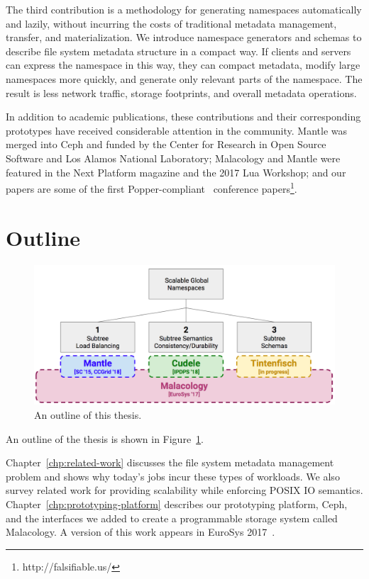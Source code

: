The third contribution is a methodology for generating namespaces automatically
and lazily, without incurring the costs of traditional metadata management,
transfer, and materialization.  We introduce namespace generators and schemas
to describe file system metadata structure in a compact way. If clients and
servers can express the namespace in this way, they can compact metadata,
modify large namespaces more quickly, and generate only relevant parts of the
namespace. The result is less network traffic, storage footprints, and overall
metadata operations.  

In addition to academic publications, these contributions and their
corresponding prototypes have received considerable attention in the community.
Mantle was merged into Ceph and funded by the Center for Research in Open
Source Software and Los Alamos National Laboratory; Malacology and Mantle were
featured in the Next Platform magazine and the 2017 Lua Workshop; and our
papers are some of the first Popper-compliant~\cite{jimenez:login16-popper,
jimenez:ipdpsw17-popper, jimenez_tackling_2015, jimenez_aver_2016,
jimenez:rr18-popper} conference papers\footnote{http://falsifiable.us/}.

\section{Outline}

\begin{figure}[tb]
  \centering
  \includegraphics[width=1\textwidth]{./chapters/overview.png}
  \caption{An outline of this thesis.}
  \label{fig:thesis-overview}
\end{figure}

An outline of the thesis is shown in Figure~\ref{fig:thesis-overview}.

Chapter~\ref{chp:related-work} discusses the file system metadata management
problem and shows why today's jobs incur these types of workloads. We also
survey related work for providing scalability while enforcing POSIX IO
semantics. Chapter~\ref{chp:prototyping-platform} describes our prototyping
platform, Ceph, and the interfaces we added to create a programmable storage
system called Malacology. A version of this work appears in EuroSys
2017~\cite{sevilla:eurosys17-malacology}.

